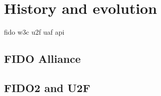 \section{History and evolution}

\gls{fido} \gls{w3c} \gls{u2f} \gls{uaf} \gls{api}

\subsection{FIDO Alliance}

\subsection{FIDO2 and U2F}